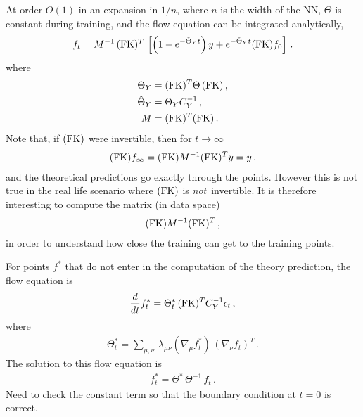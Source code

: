 \documentclass[11pt]{article}
\begin{document}
At order $O(1)$ in an expansion in $1/n$, where $n$ is the width of the NN, $\Theta$ is constant during training, and the flow equation can be integrated analytically, 
\begin{align}
    \label{eq:IntegrateFlowAtLeadingOrder}
    f_t = M^{-1}\, (\mathrm{FK})^T\, \left[
        \left(1 - e^{-\hat{\Theta}_Yt}\right) y +
        e^{-\hat{\Theta}_Y t} (\mathrm{FK}) f_0
    \right]\, .
\end{align}
where 
\begin{align}
    \label{eq:DefineThetaM}
    \Theta_Y &= (\mathrm{FK})^T \Theta\, (\mathrm{FK})\, , \\
    \hat{\Theta}_Y &= \Theta_Y C_Y^{-1}\, , \\    
    M &=  (\mathrm{FK})^T (\mathrm{FK})\, .
\end{align}
Note that, if $(\mathrm{FK})$ were invertible, then for $t\to\infty$
\begin{align}
    (\mathrm{FK}) f_\infty = (\mathrm{FK}) M^{-1} (\mathrm{FK})^T y = y\, ,
\end{align}
and the theoretical predictions go exactly through the points. However this is not true in the real life scenario where $(\mathrm{FK})$ is {\em not}\ invertible. It is therefore interesting to compute the matrix (in data space)
\begin{align}
    (\mathrm{FK}) M^{-1} (\mathrm{FK})^T \, ,    
\end{align}
in order to understand how close the training can get to the training points. 

For points $f^*$ that do not enter in the computation of the theory prediction, the flow 
equation is
\begin{align}
    \label{eq:FlowStarLinearDataNTK}
    \frac{d}{dt} f^*_t = 
        \Theta^*_t\, (\mathrm{FK})^T C_Y^{-1} \epsilon_t\, ,
\end{align}
where 
\begin{align}
    \label{eq:NTKStarDef}
    \Theta^*_t = \sum_{\mu,\nu}\, \lambda_{\mu\nu} \left(\nabla_\mu f^*_t\right)\, 
    \left(\nabla_\nu f_t\right)^T\, .
\end{align}
The solution to this flow equation is
\begin{align}
    \label{eq:IntegrateFlowAtLeadingOrderStar}
    f^*_t = \Theta^*\, \Theta^{-1}\, f_t \, . 
\end{align}
Need to check the constant term so that the boundary condition at $t=0$ is correct. 





\appendix

\end{document}
